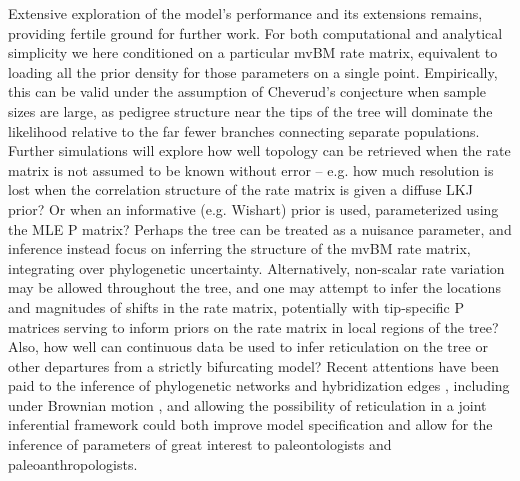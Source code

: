 \documentclass[10pt, twocolumn, twoside]{article}
\begin{document}
Extensive exploration of the model’s performance and its extensions remains, providing fertile ground for further work. For both computational and analytical simplicity we here conditioned on a particular mvBM rate matrix, equivalent to loading all the prior density for those parameters on a single point. Empirically, this can be valid under the assumption of Cheverud’s conjecture when sample sizes are large, as pedigree structure near the tips of the tree will dominate the likelihood relative to the far fewer branches connecting separate populations. Further simulations will explore how well topology can be retrieved when the rate matrix is not assumed to be known without error – e.g. how much resolution is lost when the correlation structure of the rate matrix is given a diffuse LKJ prior? Or when an informative (e.g. Wishart) prior is used, parameterized using the MLE P matrix? Perhaps the tree can be treated as a nuisance parameter, and inference instead focus on inferring the structure of the mvBM rate matrix, integrating over phylogenetic uncertainty. Alternatively, non-scalar rate variation may be allowed throughout the tree, and one may attempt to infer the locations and magnitudes of shifts in the rate matrix, potentially with tip-specific P matrices serving to inform priors on the rate matrix in local regions of the tree? Also, how well can continuous data be used to infer reticulation on the tree or other departures from a strictly bifurcating model? Recent attentions have been paid to the inference of phylogenetic networks and hybridization edges \citep[e.g. ][]{wenBayesianInferenceReticulate2016, wenCoestimatingReticulatePhylogenies2018}, including under Brownian motion \citep{pickrellInferencePopulationSplits2012}, and allowing the possibility of reticulation in a joint inferential framework could both improve model specification and allow for the inference of parameters of great interest to paleontologists and paleoanthropologists.
\end{document}
